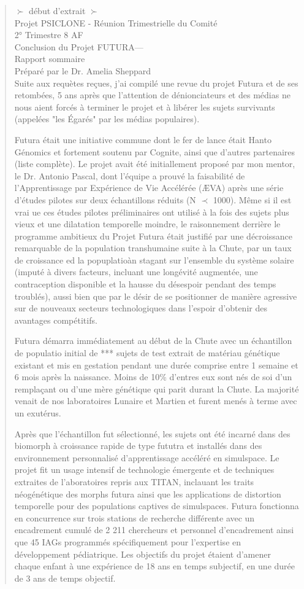 \begin{quotation} $\succ$ début d'extrait $\succ$ \\ Projet PSICLONE - Réunion Trimestrielle du Comité\\ 2° Trimestre 8 AF\\ Conclusion du Projet FUTURA— \\ Rapport sommaire\\ Préparé par le Dr. Amelia Sheppard	\\ Suite aux requètes reçues, j'ai compilé une revue du projet Futura et de ses retombées, 5 ans après que l'attention de dénionciateurs et des médias ne nous aient forcés à terminer le projet et à libérer les sujets survivants (appelées "les Égarés" par les médias populaires). 

Futura était une initiative commune dont le fer de lance était Hanto Génomics et fortement soutenu par Cognite, ainsi que d'autres partenaires (liste complète). Le projet avait été initiallement proposé par mon mentor, le Dr. Antonio Pascal, dont l'équipe a prouvé la faisabilité de l'Apprentissage par Expérience de Vie Accélérée (ÆVA) après une série d'études pilotes sur deux échantillons réduits (N $ \prec $ 1000). Même si il est vrai ue ces études pilotes préliminaires ont utilisé à la fois des sujets plus vieux et une dilatation temporelle moindre, le raisonnement derrière le programme ambitieux du Projet Futura était justifié par une décroissance remarquable de la population transhumaine suite à la Chute, par un taux de croissance ed la popuplatioàn stagant sur l'ensemble du système solaire (imputé à divers facteurs, incluant une longévité augmentée, une contraception disponible et la hausse du désespoir pendant des temps troublés), aussi bien que par le désir de se positionner de manière agressive sur de nouveaux secteurs technologiques dans l'espoir d'obtenir des avantages compétitifs. 

Futura démarra immédiatement au début de la Chute avec un échantillon de populatio initial de *** sujets de test extrait de matériau génétique existant et mis en gestation pendant une durée comprise entre 1 semaine et 6 mois après la naissance. Moins de 10\% d'entres eux sont nés de soi d'un remplaçant ou d'une mère génétique qui parit durant la Chute. La majorité venait de nos laboratoires Lunaire et Martien et furent menés à terme avec un exutérus. 

Après que l'échantillon fut sélectionné, les sujets ont été incarné dans des biomorph à croissance rapide de type fututra et installés dans des environnement personnalisé d'apprentissage accéléré en simulspace. Le projet fit un usage intensif de technologie émergente et de techniques extraites de l'aboratoires repris aux TITAN, inclauant les traits néogénétique des morphs futura ainsi que les applications de distortion temporelle pour des populations captives de simulspaces. Futura fonctionna en concurrence sur trois stations de recherche différente avec un encadrement cumulé de 2 211 chercheurs et personnel d'encadrement ainsi que 45 IAGs programmés spécifiquement pour l'expertise en développement pédiatrique. Les objectifs du projet étaient d'amener chaque enfant à une expérience de 18 ans en temps subjectif, en une durée de 3 ans de temps objectif. 


\end{quotation}
